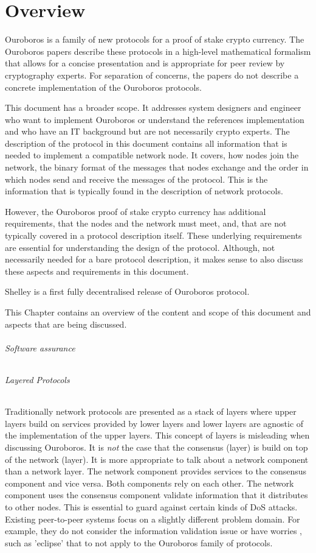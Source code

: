 \documentclass{report}
\newcommand{\wip}[1]{\color{magenta}{#1}\color{black}}
\theoremstyle{definition}{
  \newtheorem{lemma}{Lemma}[section] %
  \newtheorem{definition}[lemma]{Definition}
}
\theoremstyle{theorem}{
  \newtheorem{invariant}[lemma]{Invariant}
  \newtheorem{proofobligation}[lemma]{Proof Obligation}
}
\numberwithin{equation}{lemma}
\begin{document}
\chapter{Overview}
Ouroboros is a family of new protocols for a proof of stake crypto currency.
The Ouroboros papers describe these protocols in a high-level mathematical formalism
that allows for a concise presentation and is appropriate for peer review by cryptography experts.
For separation of concerns, the papers do not describe a concrete implementation of the Ouroboros
protocols.

This document has a broader scope.
It addresses system designers and engineer who want to implement Ouroboros or understand
the references implementation and who have an IT background but are not necessarily crypto experts. 
The description of the protocol in this document contains
all information that is needed to implement a compatible network node.
It covers, how nodes join the network, the binary format of the messages that nodes exchange and
the order in which nodes send and receive the messages of the protocol.
This is the information that is typically found in the description of network protocols.

However, the Ouroboros proof of stake crypto currency has additional requirements,
that the nodes and the network must meet, and, that are not typically covered in a
protocol  description itself.
These underlying requirements are essential for understanding the design of the protocol.
Although, not necessarily needed for a bare protocol description,
it makes sense to also discuss these aspects and requirements in this document.

Shelley is a first fully decentralised release of Ouroboros protocol.

This Chapter contains an overview of the content and scope of this document and aspects that
are being discussed.

\subparagraph{Software assurance}
\wip{Software assurance}

\subparagraph{Layered Protocols}
Traditionally network protocols are presented as a stack of layers where
upper layers build on services provided by lower layers and lower layers
are agnostic of the implementation of the upper layers.
This concept of layers is misleading when discussing Ouroboros.
It is {\em not} the case that the consensus (layer) is build on top of the network (layer).
It is more appropriate to talk about a network component than a network layer.
The network component provides services to the consensus component and vice versa.
Both components rely on each other.
The network component uses the consensus component validate
information that it distributes to other nodes.
This is essential to guard against certain kinds of DoS attacks.
Existing peer-to-peer systems focus on a slightly different problem domain.
For example, they do not consider the information validation issue
or have worries , such as 'eclipse' that to not
apply to the Ouroboros family of protocols.
\end{document}
